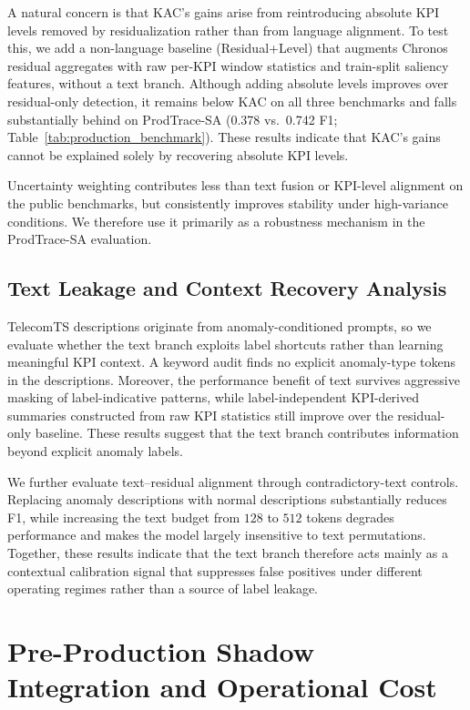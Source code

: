 \documentclass[conference]{IEEEtran}
\begin{document}
A natural concern is that KAC's gains arise from reintroducing absolute KPI levels removed by residualization rather than from language alignment. To test this, we add a non-language baseline (Residual+Level) that augments Chronos residual aggregates with raw per-KPI window statistics and train-split saliency features, without a text branch. Although adding absolute levels improves over residual-only detection, it remains below KAC on all three benchmarks and falls substantially behind on ProdTrace-SA (0.378 vs.\ 0.742 F1; Table~\ref{tab:production_benchmark}). These results indicate that KAC's gains cannot be explained solely by recovering absolute KPI levels.

Uncertainty weighting contributes less than text fusion or KPI-level alignment on the public benchmarks, but consistently improves stability under high-variance conditions. We therefore use it primarily as a robustness mechanism in the ProdTrace-SA evaluation.

\subsection{Text Leakage and Context Recovery Analysis}
\label{sec:leakage_analysis}

TelecomTS descriptions originate from anomaly-conditioned prompts, so we evaluate whether the text branch exploits label shortcuts rather than learning meaningful KPI context. A keyword audit finds no explicit anomaly-type tokens in the descriptions. Moreover, the performance benefit of text survives aggressive masking of label-indicative patterns, while label-independent KPI-derived summaries constructed from raw KPI statistics still improve over the residual-only baseline. These results suggest that the text branch contributes information beyond explicit anomaly labels.

We further evaluate text--residual alignment through contradictory-text controls. Replacing anomaly descriptions with normal descriptions substantially reduces F1, while increasing the text budget from $128$ to $512$ tokens degrades performance and makes the model largely insensitive to text permutations. Together, these results indicate that the text branch therefore acts mainly as a contextual calibration signal that suppresses false positives under different operating regimes rather than a source of label leakage.

\section{Pre-Production Shadow Integration and Operational Cost}
\label{sec:deployment}
\end{document}
